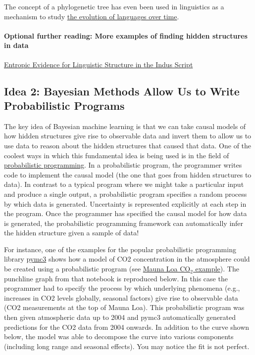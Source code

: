 \documentclass[assignment01_Solutions]{subfiles}
\begin{document}
The concept of a phylogenetic tree has even been used in linguistics as a mechanism to study \href{https://journals.plos.org/plosone/article?id=10.1371/journal.pone.0180908}{the evolution of languages over time}.

\paragraph{Optional further reading: More examples of finding hidden structures in data}

\href{https://www.science.org/doi/full/10.1126/science.1170391}{Entropic Evidence for Linguistic Structure in the Indus Script}

\subsection*{Idea 2: Bayesian Methods Allow Us to Write Probabilistic Programs}

The key idea of Bayesian machine learning is that we can take causal models of how hidden structures give rise to observable data and invert them to allow us to use data to reason about the hidden structures that caused that data.  One of the coolest ways in which this fundamental idea is being used is in the field of \href{https://en.wikipedia.org/wiki/Probabilistic_programming}{probabilistic programming}.  In a probabilistic program, the programmer writes code to implement the causal model (the one that goes from hidden structures to data).  In contrast to a typical program where we might take a particular input and produce a single output, a probabilistic program specifies a random process by which data is generated.  Uncertainty is represented explicitly at each step in the program.  Once the programmer has specified the causal model for how data is generated, the probabilistic programming framework can automatically infer the hidden structure given a sample of data!

For instance, one of the examples for the popular probabilistic programming library \href{https://docs.pymc.io/}{pymc3} shows how a model of CO2 concentration in the atmosphere could be created using a probabilistic program (see \href{https://docs.pymc.io/en/stable/pymc-examples/examples/gaussian_processes/GP-MaunaLoa.html}{Mauna Loa CO$_2$ example}).  The punchline graph from that notebook is reproduced below.  In this case the programmer had to specify the process by which underlying phenomena (e.g., increases in CO2 levels globally, seasonal factors) give rise to observable data (CO2 measurements at the top of Mauna Loa).  This probabilistic program was then given atmospheric data up to 2004 and pymc3 automatically generated predictions for the CO2 data from 2004 onwards.  In addition to the curve shown below, the model was able to decompose the curve into various components (including long range and seasonal effects).  You may notice the fit is not perfect.  
\end{document}

